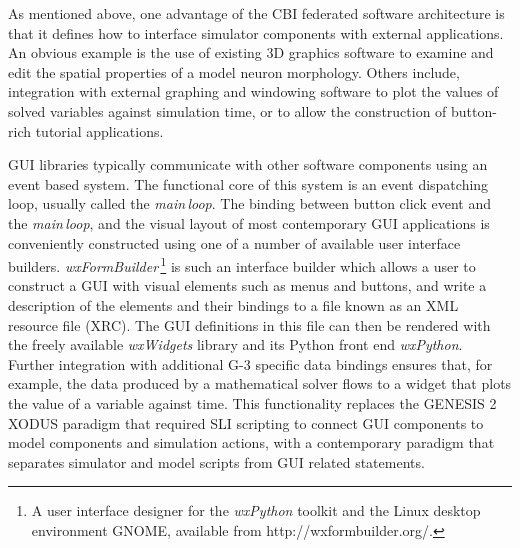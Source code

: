 \documentclass[12pt]{article}
\begin{document}
As mentioned above, one advantage of the CBI federated software
architecture is that it defines how to interface simulator components
with external applications.  An obvious example is the use of existing
3D graphics software to examine and edit the spatial properties of a
model neuron morphology.  Others include, integration with external
graphing and windowing software to plot the values of solved
variables against simulation time, or to allow the construction of
button-rich tutorial applications.

GUI libraries typically communicate with other software components
using an event based system.  The functional core of this system is an
event dispatching loop, usually called the {\it main\,loop}.
The binding between button click event and the {\it main\,loop}, and
the visual layout of most contemporary GUI applications is
conveniently constructed using one of a number of available user
interface builders.
%
%
{\it wxFormBuilder}\,\footnote{A user interface designer for the {\it
    wxPython} toolkit and the Linux desktop environment GNOME,
  available from http://wxformbuilder.org/.} is such an interface
builder which allows a user to construct a GUI with visual elements
such as menus and buttons, and write a description of the elements and
their bindings to a file known as an XML resource file (XRC).  The GUI
definitions in this file can then be rendered with the freely
available {\it wxWidgets} library and its Python front end {\it
  wxPython}.  Further integration with additional G-3 specific data
bindings ensures that, for example, the data produced by a
mathematical solver flows to a widget that plots the value of a
variable against time.  This functionality replaces the GENESIS 2
XODUS paradigm that required SLI scripting to connect GUI components
to model components and simulation actions, with a contemporary
paradigm that separates simulator and model scripts from GUI related
statements.
\end{document}
